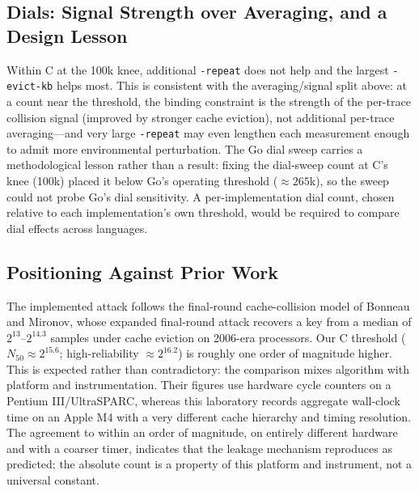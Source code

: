 \subsection{Dials: Signal Strength over Averaging, and a Design Lesson}
\label{sec:analysis-dial}
Within C at the 100k knee, additional \texttt{-repeat} does not help and the
largest \texttt{-evict-kb} helps most. This is consistent with the
averaging/signal split above: at a count near the threshold, the binding
constraint is the strength of the per-trace collision signal (improved by
stronger cache eviction), not additional per-trace averaging---and very large
\texttt{-repeat} may even lengthen each measurement enough to admit more
environmental perturbation. The Go dial sweep carries a methodological lesson
rather than a result: fixing the dial-sweep count at C's knee (100k) placed it
below Go's operating threshold ($\approx 265$k), so the sweep could not probe
Go's dial sensitivity. A per-implementation dial count, chosen relative to each
implementation's own threshold, would be required to compare dial effects across
languages.

\subsection{Positioning Against Prior Work}
\label{sec:analysis-priorwork}
The implemented attack follows the final-round cache-collision model of Bonneau
and Mironov, whose expanded final-round attack recovers a key from a median of
$2^{13}$--$2^{14.3}$ samples under cache eviction on 2006-era processors. Our C
threshold ($N_{50}\approx 2^{15.6}$; high-reliability $\approx 2^{16.2}$) is
roughly one order of magnitude higher. This is expected rather than
contradictory: the comparison mixes algorithm with platform and instrumentation.
Their figures use hardware cycle counters on a Pentium III/UltraSPARC, whereas
this laboratory records aggregate wall-clock time on an Apple M4 with a very
different cache hierarchy and timing resolution. The agreement to within an order
of magnitude, on entirely different hardware and with a coarser timer, indicates
that the leakage mechanism reproduces as predicted; the absolute count is a
property of this platform and instrument, not a universal constant.

